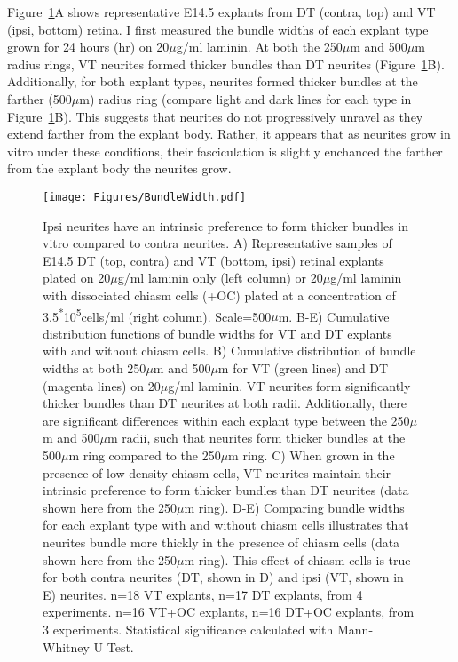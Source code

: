 Figure~\ref{Figures/BundleWidth}A shows representative E14.5 explants from DT (contra, top) and VT (ipsi, bottom) retina.
I first measured the bundle widths of each explant type grown for 24 hours (hr) on 20$\mu$g/ml laminin.
At both the 250$\mu$m and 500$\mu$m radius rings, VT neurites formed thicker bundles than DT neurites (Figure~\ref{Figures/BundleWidth}B).
Additionally, for both explant types, neurites formed thicker bundles at the farther (500$\mu$m) radius ring (compare light and dark lines for each type in Figure~\ref{Figures/BundleWidth}B).
This suggests that neurites do not progressively unravel as they extend farther from the explant body.
Rather, it appears that as neurites grow in vitro under these conditions, their fasciculation is slightly enchanced the farther from the explant body the neurites grow.
\begin{figure}[hbtp]
    \begin{center}
        \texttt{[image: Figures/BundleWidth.pdf]}
        \caption[Ipsi neurites have an intrinsic preference to form thicker bundles in vitro compared to contra neurites.]
        {Ipsi neurites have an intrinsic preference to form thicker bundles in vitro compared to contra neurites.
		A) Representative samples of E14.5 DT (top, contra) and VT (bottom, ipsi) retinal explants plated on 20$\mu$g/ml laminin only (left column) or 20$\mu$g/ml laminin with dissociated chiasm cells (+OC) plated at a concentration of 3.5\textsuperscript{*}10\textsuperscript{5}cells/ml (right column).
		Scale=500$\mu$m.
		B-E) Cumulative distribution functions of bundle widths for VT and DT explants with and without chiasm cells.
		B) Cumulative distribution of bundle widths at both 250$\mu$m and 500$\mu$m for VT (green lines) and DT (magenta lines) on 20$\mu$g/ml laminin.
		VT neurites form significantly thicker bundles than DT neurites at both radii.
		Additionally, there are significant differences within each explant type between the 250$\mu$m and 500$\mu$m radii, such that neurites form thicker bundles at the 500$\mu$m ring compared to the 250$\mu$m ring.
		C) When grown in the presence of low density chiasm cells, VT neurites maintain their intrinsic preference to form thicker bundles than DT neurites (data shown here from the 250$\mu$m ring).
		D-E) Comparing bundle widths for each explant type with and without chiasm cells illustrates that neurites bundle more thickly in the presence of chiasm cells (data shown here from the 250$\mu$m ring).
		This effect of chiasm cells is true for both contra neurites (DT, shown in D) and ipsi (VT, shown in E) neurites.
		n=18 VT explants, n=17 DT explants, from 4 experiments.
		n=16 VT+OC explants, n=16 DT+OC explants, from 3 experiments.
		Statistical significance calculated with Mann-Whitney U Test.
		}
        \label{Figures/BundleWidth}
    \end{center}
\end{figure}

